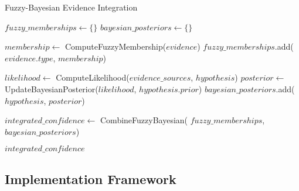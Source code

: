 \documentclass[12pt,a4paper]{article}
\begin{document}
\begin{algorithm}
\caption{Fuzzy-Bayesian Evidence Integration}
\begin{algorithmic}
    \State $fuzzy\_memberships \gets \{\}$
    \State $bayesian\_posteriors \gets \{\}$
    
        \State $membership \gets$ ComputeFuzzyMembership($evidence$)
        \State $fuzzy\_memberships$.add($evidence.type$, $membership$)
    \EndFor
    
        \State $likelihood \gets$ ComputeLikelihood($evidence\_sources$, $hypothesis$)
        \State $posterior \gets$ UpdateBayesianPosterior($likelihood$, $hypothesis.prior$)
        \State $bayesian\_posteriors$.add($hypothesis$, $posterior$)
    \EndFor
    
    \State $integrated\_confidence \gets$ CombineFuzzyBayesian(
        $fuzzy\_memberships$, $bayesian\_posteriors$)
    
    \State \Return $integrated\_confidence$
\EndProcedure
\end{algorithmic}
\end{algorithm}

\subsection{Implementation Framework}
\end{document}
